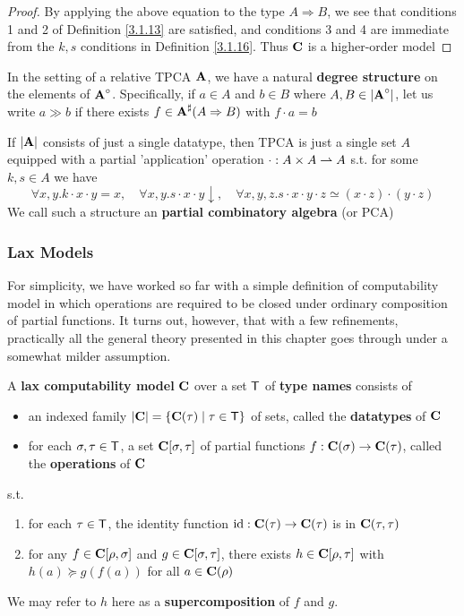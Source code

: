 \documentclass[11pt]{article}
\begin{document}
\begin{proof}
By applying the above equation to the type \(A\Rightarrow B\), we see that conditions 1 and 2 of
Definition \ref{3.1.13} are satisfied, and conditions 3 and 4 are immediate from the \(k,s\)
conditions in Definition \ref{3.1.16}. Thus \(\operatorname{\textbf{C}}\) is a higher-order model
\end{proof}

In the setting of a relative TPCA \(\operatorname{\textbf{A}}\), we have a natural \textbf{degree structure} on the elements
of \(\operatorname{\textbf{A}}^\circ\). Specifically, if \(a\in A\) and \(b\in B\) where \(A,B\in\abs{\bA^\circ}\), let us
write \(a\gg b\) if there exists \(f\in\operatorname{\textbf{A}}^\sharp(A\Rightarrow B)\) with \(f\cdot a=b\)

If \(\abs{\bA}\) consists of just a single datatype, then TPCA is just a single set \(A\) equipped
with a partial 'application' operation \(\cdot:A\times A\rightharpoonup A\) s.t. for some \(k,s\in A\) we have
\begin{equation*}
\forall x,y.k\cdot x\cdot y=x,\quad\forall x,y.s\cdot x\cdot y\downarrow,\quad\forall x,y,z.s\cdot x\cdot y\cdot z\simeq(x\cdot z)\cdot(y\cdot z)
\end{equation*}
We call such a structure an \textbf{partial combinatory algebra} (or PCA)
\subsubsection{Lax Models}
\label{sec:org468fcf0}
For simplicity, we have worked so far with a simple definition of computability model in which
operations are required to be closed under ordinary composition of partial functions. It turns
out, however, that with a few refinements, practically all the general theory presented in this
chapter goes through under a somewhat milder assumption.

\begin{definition}[]
A \textbf{lax computability model} \(\operatorname{\textbf{C}}\)  over a set \(\textsf{T}\) of \textbf{type names} consists of
\begin{itemize}
\item an indexed family \(\abs{\bC}=\{\bC(\tau)\mid\tau\in\sfT\}\) of sets, called the \textbf{datatypes} of \(\operatorname{\textbf{C}}\)
\item for each \(\sigma,\tau\in\textsf{T}\), a set \(\operatorname{\textbf{C}}[\sigma,\tau]\) of partial functions \(f:\operatorname{\textbf{C}}(\sigma)\to\operatorname{\textbf{C}}(\tau)\), called the
\textbf{operations} of \(\operatorname{\textbf{C}}\)
\end{itemize}


s.t.
\begin{enumerate}
\item for each \(\tau\in\textsf{T}\), the identity function \(\operatorname{id}:\operatorname{\textbf{C}}(\tau)\to\operatorname{\textbf{C}}(\tau)\) is in \(\operatorname{\textbf{C}}(\tau,\tau)\)
\item for any \(f\in\operatorname{\textbf{C}}[\rho,\sigma]\) and \(g\in\operatorname{\textbf{C}}[\sigma,\tau]\), there exists \(h\in\operatorname{\textbf{C}}[\rho,\tau]\) with \(h(a)\succeq g(f(a))\) for
all \(a\in\operatorname{\textbf{C}}(\rho)\)
\end{enumerate}


We may refer to \(h\) here as a \textbf{supercomposition} of \(f\) and \(g\).
\end{definition}
\end{document}

